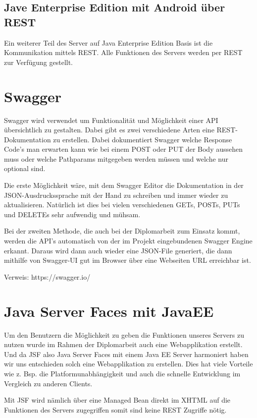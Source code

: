 \subsection{Jave Enterprise Edition mit Android über REST}\label{sec:javaeeandroidrest}
Ein weiterer Teil des Server auf Java Enterprise Edition Basis ist die Kommunikation mittels REST. Alle Funktionen des Servers werden per REST zur Verfügung gestellt.

\section{Swagger}\label{sec:javaeeandroidrestswagger}
Swagger wird verwendet um Funktionalität und Möglichkeit einer API übersichtlich zu gestalten. Dabei gibt es zwei verschiedene Arten eine REST-Dokumentation zu erstellen.
Dabei dokumentiert Swagger welche Response Code's man erwarten kann wie bei einem POST oder PUT der Body aussehen muss oder welche Pathparams mitgegeben werden müssen und welche nur optional sind.  

Die erste Möglichkeit wäre, mit dem Swagger Editor die Dokumentation in der JSON-Ausdruckssprache mit der Hand zu schreiben und immer wieder zu aktualisieren. Natürlich ist dies bei vielen verschiedenen GETs, POSTs, PUTs und DELETEs sehr aufwendig und mühsam.

Bei der zweiten Methode, die auch bei der Diplomarbeit zum Einsatz kommt, werden die API's automatisch von der im Projekt eingebundenen Swagger Engine erkannt. Daraus wird dann auch wieder eine JSON-File generiert, die dann mithilfe von Swagger-UI gut im Browser über eine Webseiten URL erreichbar ist.


Verweis: https://swagger.io/

\section{Java Server Faces mit JavaEE}\label{sec:javaeejsf}
Um den Benutzern die Möglichkeit zu geben die Funktionen unseres Servers zu nutzen wurde im Rahmen der Diplomarbeit auch eine Webapplikation erstellt. Und da JSF also Java Server Faces mit einem Java EE Server harmoniert haben wir uns entschieden solch eine Webapplikation zu erstellen. Dies hat viele Vorteile wie z. Bsp. die Platformunabhängigkeit und auch die schnelle Entwicklung im Vergleich zu anderen Clients. 

Mit JSF wird nämlich über eine Managed Bean direkt im XHTML auf die Funktionen des Servers zugegriffen somit sind keine REST Zugriffe nötig.

